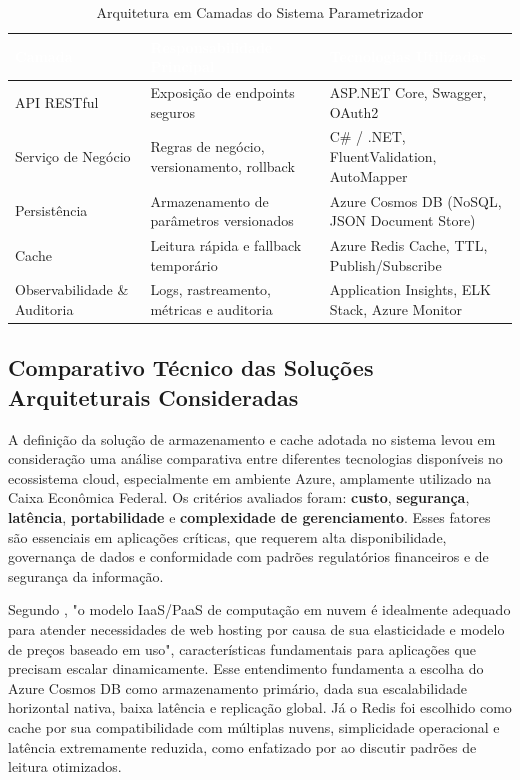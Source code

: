 \begin{table}[h]
	\centering
	\caption{Arquitetura em Camadas do Sistema Parametrizador}
	\label{tab:arquitetura_camadas}
	\begin{tabular}{p{4cm}p{6cm}p{5cm}}
		\toprule
		\rowcolor{headerpurple}
		\textcolor{white}{\textbf{Camada}} & \textcolor{white}{\textbf{Responsabilidade Principal}} & \textcolor{white}{\textbf{Tecnologias Utilizadas}} \\
		\midrule
		API RESTful & Exposição de endpoints seguros & ASP.NET Core, Swagger, OAuth2 \\
		\rowcolor{lightpurple}
		Serviço de Negócio & Regras de negócio, versionamento, rollback & C\# / .NET, FluentValidation, AutoMapper \\
		Persistência & Armazenamento de parâmetros versionados & Azure Cosmos DB (NoSQL, JSON Document Store) \\
		\rowcolor{lightpurple}
		Cache & Leitura rápida e fallback temporário & Azure Redis Cache, TTL, Publish/Subscribe \\
		Observabilidade \& Auditoria & Logs, rastreamento, métricas e auditoria & Application Insights, ELK Stack, Azure Monitor \\
		\bottomrule
	\end{tabular}
\end{table}

\subsection*{Comparativo Técnico das Soluções Arquiteturais Consideradas}

A definição da solução de armazenamento e cache adotada no sistema levou em consideração uma análise comparativa entre diferentes tecnologias disponíveis no ecossistema cloud, especialmente em ambiente Azure, amplamente utilizado na Caixa Econômica Federal. Os critérios avaliados foram: \textbf{custo}, \textbf{segurança}, \textbf{latência}, \textbf{portabilidade} e \textbf{complexidade de gerenciamento}. Esses fatores são essenciais em aplicações críticas, que requerem alta disponibilidade, governança de dados e conformidade com padrões regulatórios financeiros e de segurança da informação.

Segundo , "o modelo IaaS/PaaS de computação em nuvem é idealmente adequado para atender necessidades de web hosting por causa de sua elasticidade e modelo de preços baseado em uso", características fundamentais para aplicações que precisam escalar dinamicamente. Esse entendimento fundamenta a escolha do Azure Cosmos DB como armazenamento primário, dada sua escalabilidade horizontal nativa, baixa latência e replicação global. Já o Redis foi escolhido como cache por sua compatibilidade com múltiplas nuvens, simplicidade operacional e latência extremamente reduzida, como enfatizado por  ao discutir padrões de leitura otimizados.

